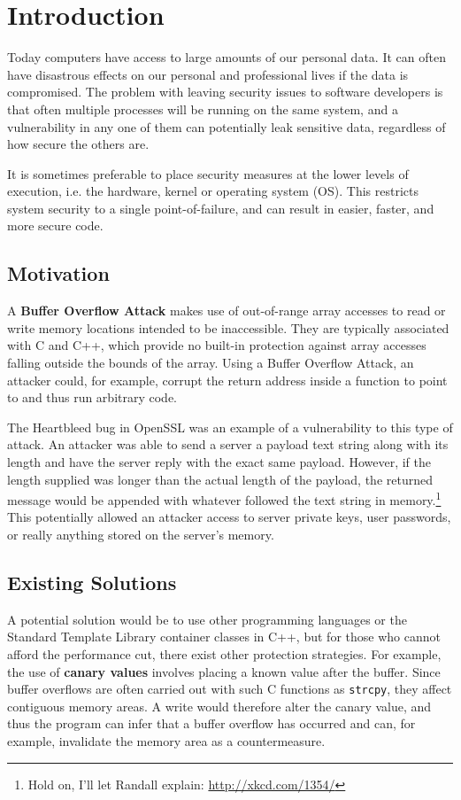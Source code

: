 \chapter{Introduction}
Today computers have access to large amounts of our personal data. It can often have disastrous effects on our personal and professional lives if the data is compromised. The problem with leaving security issues to software developers is that often multiple processes will be running on the same system, and a vulnerability in any one of them can potentially leak sensitive data, regardless of how secure the others are.

It is sometimes preferable to place security measures at the lower levels of execution, i.e. the hardware, kernel or operating system (OS). This restricts system security to a single point-of-failure, and can result in easier, faster, and more secure code.

\section{Motivation}
A \textbf{Buffer Overflow Attack} makes use of out-of-range array accesses to read or write memory locations intended to be inaccessible. They are typically associated with C and C++, which provide no built-in protection against array accesses falling outside the bounds of the array. Using a Buffer Overflow Attack, an attacker could, for example, corrupt the return address inside a function to point to and thus run arbitrary code.

The Heartbleed bug in OpenSSL\cite{heartbleed} was an example of a vulnerability to this type of attack. An attacker was able to send a server a payload text string along with its length and have the server reply with the exact same payload. However, if the length supplied was longer than the actual length of the payload, the returned message would be appended with whatever followed the text string in memory.\footnote{Hold on, I'll let Randall explain: \url{http://xkcd.com/1354/}} This potentially allowed an attacker access to server private keys, user passwords, or really anything stored on the server's memory.

\section{Existing Solutions}
A potential solution would be to use other programming languages or the Standard Template Library container classes in C++, but for those who cannot afford the performance cut, there exist other protection strategies. For example, the use of \textbf{canary values} involves placing a known value after the buffer. Since buffer overflows are often carried out with such C functions as \verb|strcpy|, they affect contiguous memory areas. A write would therefore alter the canary value, and thus the program can infer that a buffer overflow has occurred and can, for example, invalidate the memory area as a countermeasure.

